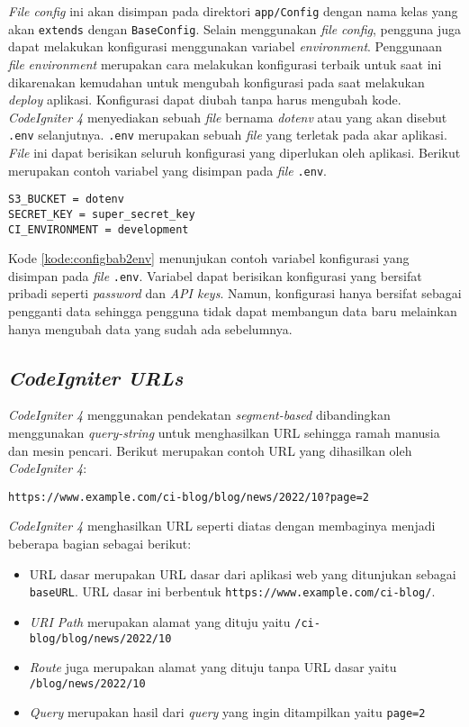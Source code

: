 \textit{File config} ini akan disimpan pada direktori \texttt{app/Config} dengan nama kelas yang akan \texttt{extends} dengan \texttt{BaseConfig}. Selain menggunakan \textit{file} \textit{config}, pengguna juga dapat melakukan konfigurasi menggunakan variabel \textit{environment}. Penggunaan \textit{file} \textit{environment} merupakan cara melakukan konfigurasi terbaik untuk saat ini dikarenakan kemudahan untuk mengubah konfigurasi pada saat melakukan \textit{deploy} aplikasi. Konfigurasi dapat diubah tanpa harus mengubah kode. \textit{CodeIgniter 4} menyediakan sebuah \textit{file} bernama \textit{dotenv} atau yang akan disebut \texttt{.env} selanjutnya. \texttt{.env} merupakan sebuah \textit{file} yang terletak pada akar aplikasi. \textit{File} ini dapat berisikan seluruh konfigurasi yang diperlukan oleh aplikasi. Berikut merupakan contoh variabel yang disimpan pada \textit{file} \texttt{.env}.
\begin{lstlisting}[caption=Contoh variabel yang disimpan pada \textit{file} \texttt{.env}. ,label=kode:configbab2env]
S3_BUCKET = dotenv
SECRET_KEY = super_secret_key
CI_ENVIRONMENT = development
\end{lstlisting}
Kode \ref{kode:configbab2env} menunjukan contoh variabel konfigurasi yang disimpan pada \textit{file} \texttt{.env}. Variabel dapat berisikan konfigurasi yang bersifat pribadi seperti \textit{password} dan \textit{API keys}. Namun, konfigurasi hanya bersifat sebagai pengganti data sehingga pengguna tidak dapat membangun data baru melainkan hanya mengubah data yang sudah ada sebelumnya.

\subsection{\textit{CodeIgniter URLs}}
\textit{CodeIgniter 4} menggunakan pendekatan \textit{segment-based} dibandingkan menggunakan \textit{query-string} untuk menghasilkan URL sehingga ramah manusia dan mesin pencari. Berikut merupakan contoh URL yang dihasilkan oleh \textit{CodeIgniter 4}:

\begin{center}
\texttt{https://www.example.com/ci-blog/blog/news/2022/10?page=2}
\end{center}

\textit{CodeIgniter 4} menghasilkan URL seperti diatas dengan membaginya menjadi beberapa bagian sebagai berikut:

\begin{itemize}
\item URL dasar merupakan URL dasar dari aplikasi web yang ditunjukan sebagai \texttt{baseURL}. URL dasar ini berbentuk \texttt{https://www.example.com/ci-blog/}.
\item \textit{URI Path} merupakan alamat yang dituju yaitu \texttt{/ci-blog/blog/news/2022/10} 
\item \textit{Route} juga merupakan alamat yang dituju tanpa URL dasar yaitu \texttt{/blog/news/2022/10} 
\item \textit{Query} merupakan hasil dari \textit{query} yang ingin ditampilkan yaitu \texttt{page=2}
\end{itemize}

